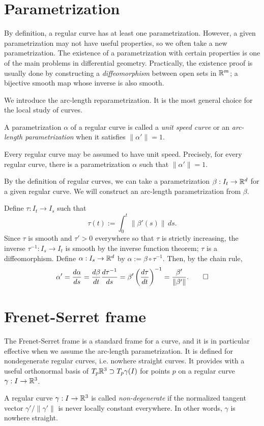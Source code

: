 \documentclass{../note}
\def\a{\alpha}
\begin{document}
\section{Parametrization}

By definition, a regular curve has at least one parametrization.
However, a given parametrization may not have useful properties, so we often take a new parametrization.
The existence of a parametrization with certain properties is one of the main problems in differential geometry.
Practically, the existence proof is usually done by constructing a \emph{diffeomorphism} between open sets in $\mathbb{R}^m$; a bijective smooth map whose inverse is also smooth.

We introduce the arc-length reparametrization.
It is the most general choice for the local study of curves.
\begin{defn}
A parametrization $\a$ of a regular curve is called a \emph{unit speed curve} or an \emph{arc-length parametrization} when it satisfies $\|\a'\|=1$.
\end{defn}
\begin{thm}
Every regular curve may be assumed to have unit speed.
Precisely, for every regular curve, there is a parametrization $\a$ such that $\|\a'\|=1$.
\end{thm}
\begin{pf}
By the definition of regular curves, we can take a parametrization $\beta:I_t\to\mathbb{R}^d$ for a given regular curve.
We will construct an arc-length parametrization from $\beta$.

Define $\tau:I_t\to I_s$ such that
\[\tau(t):=\int_0^t\|\beta'(s)\|\,ds.\]
Since $\tau$ is smooth and $\tau'>0$ everywhere so that $\tau$ is strictly increasing, the inverse $\tau^{-1}:I_s\to I_t$ is smooth by the inverse function theorem; $\tau$ is a diffeomorphism.
Define $\a:I_s\to\R^d$ by $\a:=\beta\circ\tau^{-1}$.
Then, by the chain rule,
\[\a'=\dd{\a}{s}=\dd{\beta}{t}\dd{\tau^{-1}}{s}=\beta'\left(\dd{\tau}{t}\right)^{-1}=\frac{\beta'}{\|\beta'\|}.\qedhere\]
\end{pf}




\section{Frenet-Serret frame}

The Frenet-Serret frame is a standard frame for a curve, and it is in particular effective when we assume the arc-length parametrization.
It is defined for nondegenerate regular curves, i.e. nowhere straight curves.
It provides with a useful orthonormal basis of $T_p\mathbb{R}^3\supset T_p\gamma(I)$ for points $p$ on a regular curve $\gamma:I\to\mathbb{R}^3$.
\begin{prb}
A regular curve $\gamma:I\to\mathbb{R}^3$ is called \emph{non-degenerate} if the normalized tangent vector $\gamma'/\|\gamma'\|$ is never locally constant everywhere.
In other words, $\gamma$ is nowhere straight.
\end{prb}
\end{document}
